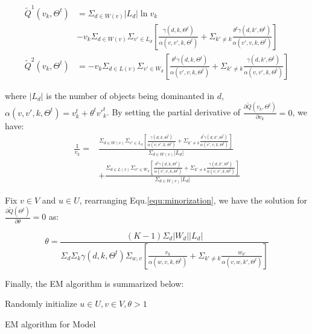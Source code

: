 \documentclass[sigconf]{acmart}
\begin{document}
\begin{align*}%
\tilde{Q}^1(v_k,\Theta^t) & = \Sigma_{d\in W(v)} |L_d| \ln v_k \\\nonumber
& -v_k\Sigma_{d\in W(v)}\Sigma_{v'\in L_d} [\frac{\gamma(d,k,\Theta^t)}{ \alpha(v,v',k,\Theta^t)} +\Sigma_{k'\neq k}\frac{\theta^t\gamma(d,k',\Theta^t)}{\alpha(v',v,k,\Theta^t)}]\\ \nonumber
\tilde{Q}^2(v_k,\Theta^t) & = -v_k \Sigma_{d\in L(v)}\Sigma_{v'\in W_d} [\frac{\theta^t \gamma(d,k,\Theta^t)}{\alpha(v',v,k,\Theta^t)}+\Sigma_{k'\neq k} \frac{\gamma(d,k',\Theta^t)}{\alpha(v,v',k,\Theta^t)}] 
\end{align*}

where $|L_d|$ is the number of objects being dominanted in $d$, $\alpha(v,v',k,\Theta^t)=v_k^t + \theta^t {v'}_k^t$. By setting the partial derivative of $\frac{\partial \tilde{Q}(v_k,\Theta^t)}{\partial v_k}=0$, we have:
\begin{align}\label{equ:v}
\frac{1}{v_k}= &\frac{\Sigma_{d\in W(v)}\Sigma_{v'\in L_d} [\frac{\gamma(d,k,\Theta^t)}{ \alpha(v,v',k,\Theta^t)} +\Sigma_{k'\neq k}\frac{\theta^t\gamma(d,k',\Theta^t)}{\alpha(v',v,k,\Theta^t)}]}{\Sigma_{d\in W(v)}|L_d|}\\\nonumber
 & + \frac{\Sigma_{d\in L(v)}\Sigma_{v'\in W_d} [\frac{\theta^t \gamma(d,k,\Theta^t)}{\alpha(v',v,k,\Theta^t)}+\Sigma_{k'\neq k} \frac{\gamma(d,k',\Theta^t)}{\alpha(v,v',k,\Theta^t)}] }{\Sigma_{d\in W(v)}|L_d|}
\end{align}

Fix $v \in V$ and $u \in U$, rearranging Equ.\ref{equ:minorization}, we have the solution for $\frac{\partial \tilde{Q}(\Theta^t)}{\partial \theta}=0$ as:

\begin{equation}\label{equ:theta}
\theta = \frac{(K-1)\Sigma_d |W_d| |L_d|}{\Sigma_d \Sigma_k \gamma(d,k,\Theta^t)\Sigma_{w,v} [\frac{v_k}{\alpha(w,v,k,\Theta^t)}+\Sigma_{k'\neq k} \frac{w_{k'}}{\alpha(v,w,k',\Theta^t)}]}
\end{equation}

Finally, the EM algorithm is summarized below:

\begin{algorithm}
Randomly initialize $u \in U, v \in V, \theta >1$\;

\;
\caption{EM algorithm for Model}
\label{algo:EM}
\end{algorithm}
\end{document}
